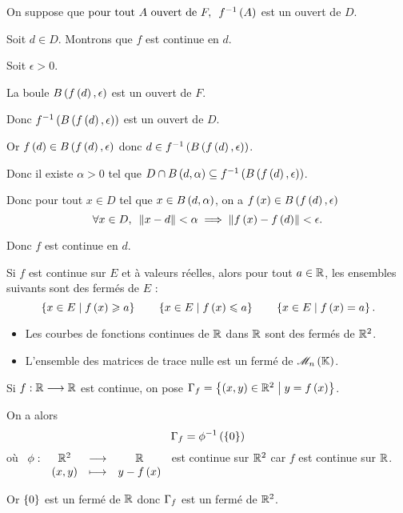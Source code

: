 \begin{dem}
On suppose que \(\quantifs{\tpt A\text{ ouvert de }F}f\inv\paren{A}\) est un ouvert de \(D\).

Soit \(d\in D\). Montrons que \(f\) est continue en \(d\).

Soit \(\epsilon>0\).

La boule \(\bouleo{f\paren{d}}{\epsilon}\) est un ouvert de \(F\).

Donc \(f\inv\paren{\bouleo{f\paren{d}}{\epsilon}}\) est un ouvert de \(D\).

Or \(f\paren{d}\in\bouleo{f\paren{d}}{\epsilon}\) donc \(d\in f\inv\paren{\bouleo{f\paren{d}}{\epsilon}}\).

Donc il existe \(\alpha>0\) tel que \(D\inter\bouleo{d}{\alpha}\subset f\inv\paren{\bouleo{f\paren{d}}{\epsilon}}\).

Donc pour tout \(x\in D\) tel que \(x\in\bouleo{d}{\alpha}\), on a \(f\paren{x}\in\bouleo{f\paren{d}}{\epsilon}\) \ie \[\quantifs{\forall x\in D}\norme{x-d}<\alpha\imp\norme{f\paren{x}-f\paren{d}}<\epsilon.\]

Donc \(f\) est continue en \(d\).
\end{dem}

\begin{ex}
Si \(f\) est continue sur \(E\) et à valeurs réelles, alors pour tout \(a\in\mathbb{R}\), les ensembles suivants sont des fermés de \(E\) : \[\left\lbrace x\in E\;\middle|\; f\left(x\right)\geqslant a\right\rbrace\qquad\left\lbrace x\in E\;\middle|\; f\left(x\right)\leqslant a\right\rbrace\qquad\left\lbrace x\in E\;\middle|\; f\left(x\right)=a\right\rbrace.\]
\end{ex}

\begin{ex}
\begin{itemize}
    \item Les courbes de fonctions continues de \(\mathbb{R}\) dans \(\mathbb{R}\) sont des fermés de \(\mathbb{R}^2\). \\
    \item L'ensemble des matrices de trace nulle est un fermé de \(\M{n}\).
\end{itemize}
\end{ex}

\begin{dem}
Si \(f:\mathbb{R}\longrightarrow\mathbb{R}\) est continue, on pose \(\Gamma_{f}=\left\lbrace\left(x,y\right)\in\mathbb{R}^2\;\middle|\; y=f\left(x\right)\right\rbrace\).

On a alors \[\Gamma_{f}=\phi^{-1}\left(\left\lbrace0\right\rbrace\right)\] où \(\begin{array}[t]{cccc}\phi : & \mathbb{R}^2 & \longrightarrow & \mathbb{R} \\ & \left(x,y\right) & \longmapsto & y-f\left(x\right)\end{array}\) est continue sur \(\mathbb{R}^2\) car \(f\) est continue sur \(\mathbb{R}\).

Or \(\left\lbrace0\right\rbrace\) est un fermé de \(\mathbb{R}\) donc \(\Gamma_{f}\) est un fermé de \(\mathbb{R}^2\).
\end{dem}

